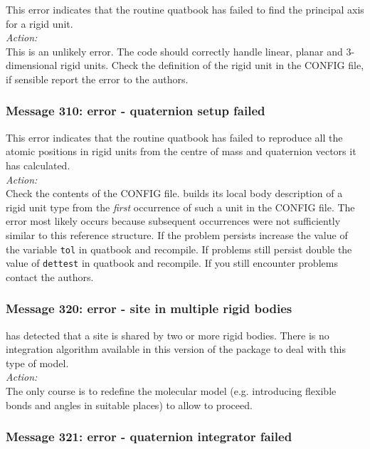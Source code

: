 This error indicates that the routine {\sc quatbook} has failed to
find the principal axis for a rigid unit. \\

\noindent
{\em Action:}\\
This is an unlikely error. The code should correctly handle linear,
planar and 3-dimensional rigid units. Check the definition of the
rigid unit in the CONFIG file, if sensible report the error to the
authors.

\subsubsection*{Message 310: error - quaternion setup failed}

This error indicates that the routine {\sc quatbook} has failed to
reproduce all the atomic positions in rigid units from the
centre of mass and quaternion vectors it has calculated. \\

\noindent
{\em Action:}\\ Check the contents of the CONFIG file. \D{} builds its
local body description of a rigid unit type from the {\em first} occurrence
of such a unit in the CONFIG file. The error most likely occurs because 
subsequent occurrences were not sufficiently similar to this reference
structure. If the problem persists increase the value of the variable
{\tt tol} in {\sc quatbook} and recompile. If problems still persist
double the value of {\tt dettest} in {\sc quatbook} and recompile.
If you still encounter problems contact the authors.

\subsubsection*{Message 320: error - site in multiple rigid bodies}

\D{} has detected that a site is shared by two or more rigid
bodies. There is no integration algorithm available in this version of
the package to deal with this type of model. \\

\noindent
{\em Action:}\\
The only course is to redefine the molecular model (e.g. introducing
flexible bonds and angles in suitable places) to allow \D{}
to proceed.

\subsubsection*{Message 321: error - quaternion integrator failed}


